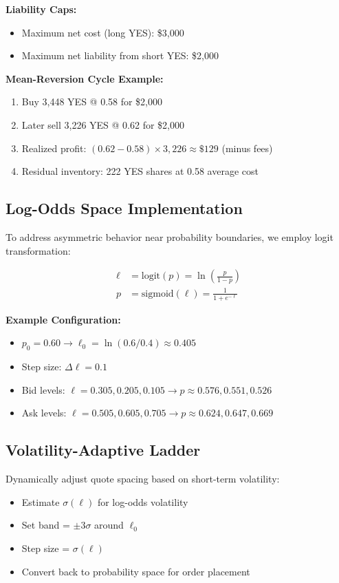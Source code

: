 \documentclass[11pt]{article}
\begin{document}
\textbf{Liability Caps:}
\begin{itemize}
    \item Maximum net cost (long YES): \$3,000
    \item Maximum net liability from short YES: \$2,000
\end{itemize}

\textbf{Mean-Reversion Cycle Example:}
\begin{enumerate}
    \item Buy 3,448 YES @ 0.58 for \$2,000
    \item Later sell 3,226 YES @ 0.62 for \$2,000
    \item Realized profit: $(0.62-0.58) \times 3,226 \approx \$129$ (minus fees)
    \item Residual inventory: 222 YES shares at 0.58 average cost
\end{enumerate}

\subsection{Log-Odds Space Implementation}

To address asymmetric behavior near probability boundaries, we employ logit transformation:

\begin{align}
\ell &= \text{logit}(p) = \ln\left(\frac{p}{1-p}\right) \\
p &= \text{sigmoid}(\ell) = \frac{1}{1+e^{-\ell}}
\end{align}

\textbf{Example Configuration:}
\begin{itemize}
    \item $p_0 = 0.60 \rightarrow \ell_0 = \ln(0.6/0.4) \approx 0.405$
    \item Step size: $\Delta\ell = 0.1$
    \item Bid levels: $\ell = 0.305, 0.205, 0.105 \rightarrow p \approx 0.576, 0.551, 0.526$
    \item Ask levels: $\ell = 0.505, 0.605, 0.705 \rightarrow p \approx 0.624, 0.647, 0.669$
\end{itemize}

\subsection{Volatility-Adaptive Ladder}

Dynamically adjust quote spacing based on short-term volatility:
\begin{itemize}
    \item Estimate $\sigma(\ell)$ for log-odds volatility
    \item Set band = $\pm 3\sigma$ around $\ell_0$
    \item Step size = $\sigma(\ell)$
    \item Convert back to probability space for order placement
\end{itemize}
\end{document}
